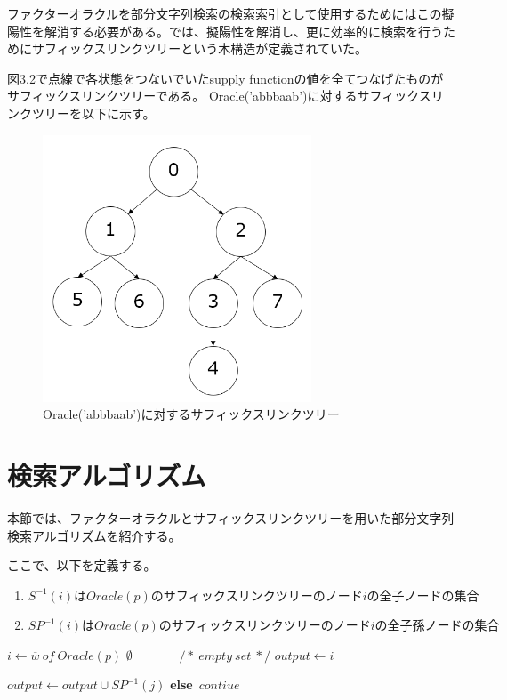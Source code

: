 \documentclass[11pt,a4paper]{jreport}
\begin{document}
  ファクターオラクルを部分文字列検索の検索索引として使用するためにはこの擬陽性を解消する必要がある。\cite{kato}では、擬陽性を解消し、更に効率的に検索を行うためにサフィックスリンクツリーという木構造が定義されていた。  

  図3.2で点線で各状態をつないでいたsupply functionの値を全てつなげたものがサフィックスリンクツリーである。
  Oracle('abbbaab')に対するサフィックスリンクツリーを以下に示す。
  \begin{figure}[htbp]
    \centering
    \includegraphics[width=8cm]{slt.png}
    \caption{Oracle('abbbaab')に対するサフィックスリンクツリー}
  \end{figure}

  \section{検索アルゴリズム}
  本節では、ファクターオラクルとサフィックスリンクツリーを用いた部分文字列検索アルゴリズムを紹介する。

  ここで、以下を定義する。
  \begin{enumerate}
    \item $S^{-1}(i)はOracle(p)のサフィックスリンクツリーのノードiの全子ノードの集合$
    \item $SP^{-1}(i)はOracle(p)のサフィックスリンクツリーのノードiの全子孫ノードの集合$
  \end{enumerate}

  \begin{algorithm}
    \caption{$\textbf{find\_all\_occurence}(Oracle(p), w)$}
    \label{alg3}
    \begin{algorithmic}[1]
      \State $i \leftarrow \overline{w}\ of\ Oracle(p)$
      \Else
      \Return $\emptyset \ \ \ \ \ \ \ \ \ \ \ \ \ \ \ \ \ /*\ empty\ set\ */$
      \EndIf
      \State $output\leftarrow i$
      \EndIf

      \State $output\leftarrow output \cup SP^{-1}(j)$
      \EndIf
      \State \textbf{else}\ $contiue$
      \EndFor
    \end{algorithmic}
  \end{algorithm}
  \newpage
\end{document}
